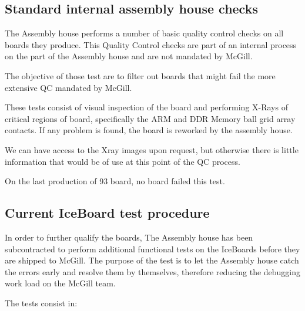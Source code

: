 \documentclass[11pt,article]{memoir}
\begin{document}
\subsection{Standard internal assembly house checks}

The Assembly house performs a number of basic quality control checks on all boards they
produce. This Quality Control checks are part of an internal process on the part of the
Assembly house and are not mandated by McGill.

The objective of those test are to filter out boards that might fail the more extensive QC mandated by McGill.

These tests consist of visual inspection of the board and performing X-Rays of
critical regions of board, specifically the ARM and DDR Memory ball grid array
contacts. If any problem is found, the board is reworked by the assembly
house.

We can have access to the Xray images upon request, but otherwise there is
little information that would be of use at this point of the QC process.

On the last production of 93 board, no board failed this test.

\subsection{Current IceBoard test procedure}

In order to further qualify the boards, The Assembly house has been
subcontracted to perform additional functional tests on the IceBoards before
they are shipped to McGill. The purpose of the test is to let the Assembly
house catch the errors early and resolve them by themselves, therefore
reducing the debugging work load on the McGill team.

The tests consist in:
\end{document}
